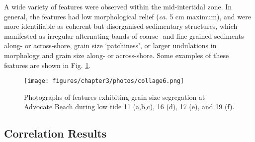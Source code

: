 A wide variety of features were observed within the mid-intertidal zone. In general, the features had low morphological relief (\textit{ca}. 5 cm maximum), and were more identifiable as coherent but disorganised sedimentary structures, which manifested as irregular alternating bands of coarse- and fine-grained sediments along- or across-shore, grain size `patchiness', or larger undulations in morphology and grain size along- or across-shore. Some examples of these features are shown in Fig. \ref{fig:patchiness_photo3}.

\begin{figure}[tbp] %
	\texttt{[image: figures/chapter3/photos/collage6.png]}
	\caption[Photographs of grain size segregation at Advocate Beach]{Photographs of features exhibiting grain size segregation at Advocate Beach during low tide 11 (a,b,c), 16 (d), 17 (e), and 19 (f).}
	\label{fig:patchiness_photo3}
\end{figure}



\subsection{Correlation Results}


